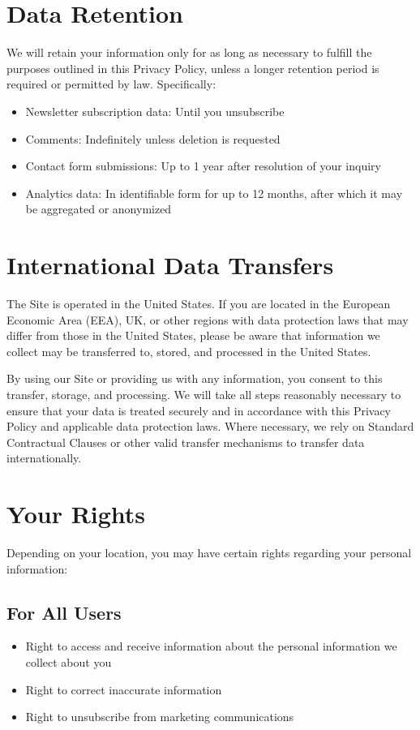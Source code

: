 \documentclass[11pt]{article}
\begin{document}
\section{Data Retention}

We will retain your information only for as long as necessary to fulfill the purposes outlined in this Privacy Policy, unless a longer retention period is required or permitted by law. Specifically:
\begin{itemize}
  \item Newsletter subscription data: Until you unsubscribe
  \item Comments: Indefinitely unless deletion is requested
  \item Contact form submissions: Up to 1 year after resolution of your inquiry
  \item Analytics data: In identifiable form for up to 12 months, after which it may be aggregated or anonymized
\end{itemize}

\section{International Data Transfers}

The Site is operated in the United States. If you are located in the European Economic Area (EEA), UK, or other regions with data protection laws that may differ from those in the United States, please be aware that information we collect may be transferred to, stored, and processed in the United States.

By using our Site or providing us with any information, you consent to this transfer, storage, and processing. We will take all steps reasonably necessary to ensure that your data is treated securely and in accordance with this Privacy Policy and applicable data protection laws. Where necessary, we rely on Standard Contractual Clauses or other valid transfer mechanisms to transfer data internationally.

\section{Your Rights}

Depending on your location, you may have certain rights regarding your personal information:

\subsection{For All Users}
\begin{itemize}
  \item Right to access and receive information about the personal information we collect about you
  \item Right to correct inaccurate information
  \item Right to unsubscribe from marketing communications
\end{itemize}
\end{document}
